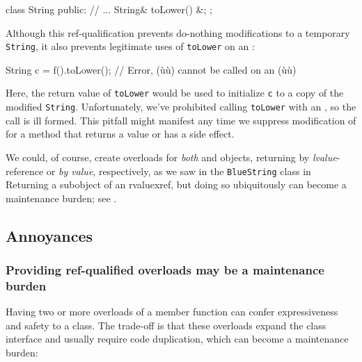 \begin{emcppslisting}[emcppsbatch=e7]
class String
{
public:
    // ...
    String& toLower() &;
};
\end{emcppslisting}
    

\noindent Although this ref-qualification prevents do-nothing modifications to a
temporary \lstinline!String!, it also prevents legitimate uses of
\lstinline!toLower! on an :

\begin{emcppslisting}[emcppsbatch=e7]
String c = f().toLower();  // Error, (ù{}ù) cannot be called on an (ù{}ù)
\end{emcppslisting}
    

\noindent Here, the return value of \lstinline!toLower! would be used to initialize
\lstinline!c! to a copy of the modified \lstinline!String!. Unfortunately,
we've prohibited calling \lstinline!toLower! with an , so the
call is ill formed. This pitfall might manifest any time we suppress
modification of  for a method that returns a value or has
a side effect.

We could, of course, create  overloads for
\emph{both}  and  objects, returning by
\emph{lvalue}-reference or \emph{by value}, respectively, as we saw in
the \lstinline!BlueString! class in  {Returning a subobject of an
rvalue}{xref}, but doing so ubiquitously can become a maintenance
burden; see .

\subsection[Annoyances]{Annoyances}\label{annoyances-refqualifier}

\subsubsection[Providing ref-qualified overloads may be a maintenance burden]{Providing ref-qualified overloads may be a maintenance burden}\label{providing-ref-qualified-overloads-may-be-a-maintenance-burden}

Having two or more  overloads of a member function
can confer expressiveness and safety to a class. The trade-off is that
these overloads expand the class interface and usually require code
duplication, which can become a maintenance burden:

